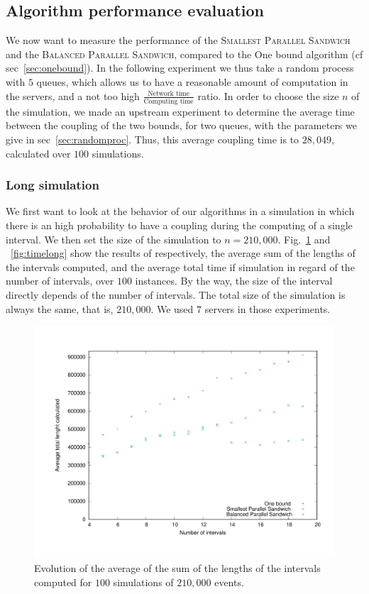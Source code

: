 \documentclass[a4paper,10pt]{article}
\begin{document}
\subsection{Algorithm performance evaluation}
We now want to measure the performance of the \textsc{Smallest Parallel Sandwich} and the \textsc{Balanced Parallel Sandwich}, compared to the One bound algorithm (cf sec~\ref{sec:onebound}). In the following experiment we thus take a random process with $5$ queues, which allows us to have a reasonable amount of computation in the servers, and a not too high $\frac{ \textrm{Network time} }{\textrm{Computing time}}$ ratio. In order to choose the size $n$ of the simulation, we made an upstream experiment to determine the average time between the coupling of the two bounds, for two queues, with the parameters we give in sec~\ref{sec:randomproc}. Thus, this average coupling time is to $28,049$, calculated over $100$ simulations.

\subsubsection{Long simulation}
We first want to look at the behavior of our algorithms in a simulation in which there is an high probability to have a coupling during the computing of a single interval. We then set the size of the simulation to $n = 210,000$. Fig.~\ref{fig:interslong} and ~\ref{fig:timelong} show the results of respectively, the average sum of the lengths of the intervals computed, and the average total time if simulation in regard of the number of intervals, over $100$ instances. By the way, the size of the interval directly depends of the number of intervals. The total size of the simulation is always the same, that is, $210,000$. We used $7$ servers in those experiments.

\begin{figure}[H]
\centering
\label{fig:interslong}
 \includegraphics[scale=0.45]{interslong.pdf}
 \caption{Evolution of the average of the sum of the lengths of the intervals computed for $100$ simulations of $210,000$ events.}
\end{figure}
\end{document}
